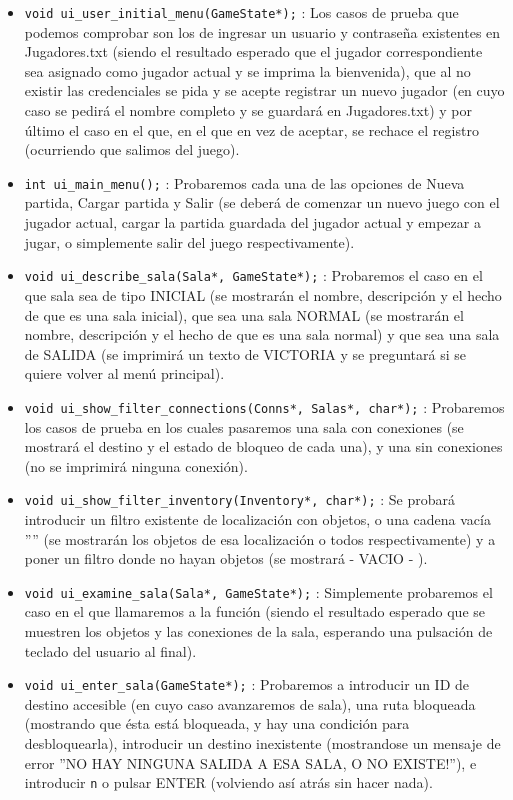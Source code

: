 \begin{itemize}
\begin{itemize}
			\item \verb|void ui_user_initial_menu(GameState*);| : Los casos de prueba que podemos comprobar son los de ingresar un usuario y contraseña existentes en Jugadores.txt (siendo el resultado esperado que el jugador correspondiente sea asignado como jugador actual y se imprima la bienvenida), que al no existir las credenciales se pida y se acepte registrar un nuevo jugador (en cuyo caso se pedirá el nombre completo y se guardará en Jugadores.txt) y por último el caso en el que, en el que en vez de aceptar, se rechace el registro (ocurriendo que salimos del juego).
			\item \verb|int ui_main_menu();| : Probaremos cada una de las opciones de Nueva partida, Cargar partida y Salir (se deberá de comenzar un nuevo juego con el jugador actual, cargar la partida guardada del jugador actual y empezar a jugar, o simplemente salir del juego respectivamente).
			\item \verb|void ui_describe_sala(Sala*, GameState*);| : Probaremos el caso en el que sala sea de tipo INICIAL (se mostrarán el nombre, descripción y el hecho de que es una sala inicial), que sea una sala NORMAL (se mostrarán el nombre, descripción y el hecho de que es una sala normal) y que sea una sala de SALIDA (se imprimirá un texto de VICTORIA y se preguntará si se quiere volver al menú principal).
			\item \verb|void ui_show_filter_connections(Conns*, Salas*, char*);| : Probaremos los casos de prueba en los cuales pasaremos una sala con conexiones (se mostrará el destino y el estado de bloqueo de cada una), y una sin conexiones (no se imprimirá ninguna conexión).
			\item \verb|void ui_show_filter_inventory(Inventory*, char*);| : Se probará introducir un filtro existente de localización con objetos, o una cadena vacía '''' (se mostrarán los objetos de esa localización o todos respectivamente) y a poner un filtro donde no hayan objetos (se mostrará - VACIO - ).
			\item \verb|void ui_examine_sala(Sala*, GameState*);| : Simplemente probaremos el caso en el que llamaremos a la función (siendo el resultado esperado que se muestren los objetos y las conexiones de la sala, esperando una pulsación de teclado del usuario al final).
			\item \verb|void ui_enter_sala(GameState*);| : Probaremos a introducir un ID de destino accesible (en cuyo caso avanzaremos de sala), una ruta bloqueada (mostrando que ésta está bloqueada, y hay una condición para desbloquearla), introducir un destino inexistente (mostrandose un mensaje de error ''NO HAY NINGUNA SALIDA A ESA SALA, O NO EXISTE!''), e introducir \verb|n| o pulsar ENTER (volviendo así atrás sin hacer nada).

\end{itemize}
\end{itemize}

